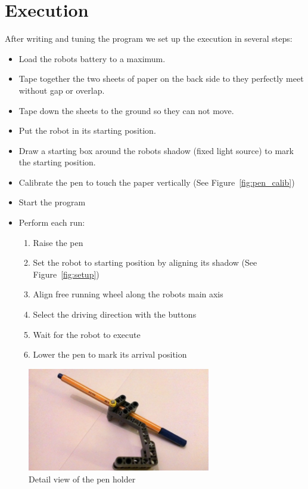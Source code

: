 \documentclass{scrartcl}
\begin{document}
\section{Execution}
After writing and tuning the program we set up the execution in several steps:
\begin{itemize}
\item Load the robots battery to a maximum.
\item Tape together the two sheets of paper on the back side to they perfectly meet without gap or overlap.
\item Tape down the sheets to the ground so they can not move.
\item Put the robot in its starting position.
\item Draw a starting box around the robots shadow (fixed light source) to mark the starting position.
\item Calibrate the pen to touch the paper vertically (See Figure~\ref{fig:pen_calib})
\item Start the program
\item Perform each run:
\begin{enumerate}
	\item Raise the pen
	\item Set the robot to starting position by aligning its shadow (See Figure~\ref{fig:setup})
	\item Align free running wheel along the robots main axis
	\item Select the driving direction with the buttons
	\item Wait for the robot to execute
	\item Lower the pen to mark its arrival position
\end{enumerate}
\end{itemize}

\begin{figure}
 \center
 \includegraphics[width= 8cm]{img/pen.jpg}
 \caption{Detail view of the pen holder}
 \label{fig:pen}
\end{figure}
\end{document}
